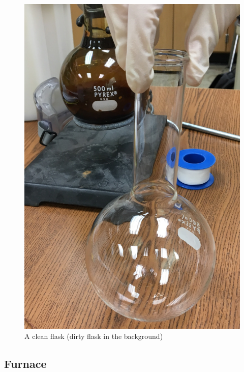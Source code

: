 \documentclass[letterpaper,11pt]{article}
\begin{document}
\begin{figure}[H]
\centering
\includegraphics[width=.25\textwidth]{clean_dirty_flask.jpg}
\caption{A clean flask (dirty flask in the background)}
\label{fig:clean_dirty}
\end{figure}  

\newpage 
    \subsection{Furnace}
\end{document}
